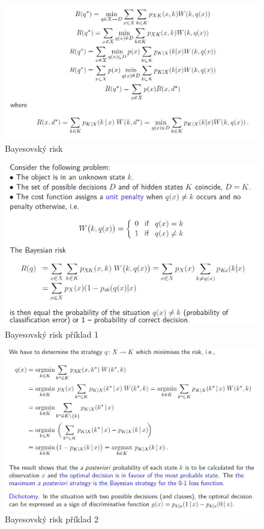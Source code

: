 \documentclass{article}
\begin{document}
\begin{figure}[h]
\begin{center}
\includegraphics[width=12cm]{bayesian_risk.jpg}
\caption{Bayesovský risk}
\label{fig:bayes}
\end{center}
\end{figure}

\begin{figure}[h]
\begin{center}
\includegraphics[width=12cm]{bayes_example.jpg}
\caption{Bayesovský risk příklad 1}
\label{fig:bayes_example1}
\end{center}
\end{figure}

\begin{figure}[h]
\begin{center}
\includegraphics[width=12cm]{bayes_example1.jpg}
\caption{Bayesovský risk příklad 2}
\label{fig:bayes_example2}
\end{center}
\end{figure}
\end{document}
